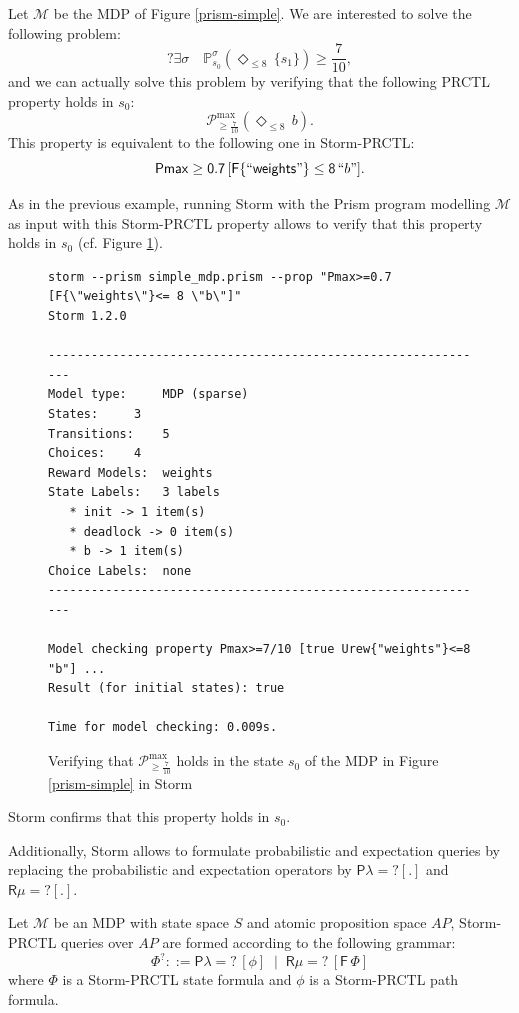 \begin{example}
Let $\mathcal{M}$ be the MDP of Figure \ref{prism-simple}. We are interested to solve the following \SSPP{} problem:
\[
  ? \exists \sigma \quad \mathbb{P}_{s_0}^\sigma(\Diamond_{\leq 8}\, \{s_1\}) \geq \frac{7}{10},
\]
and we can actually solve this problem by verifying that the following PRCTL property holds in $s_0$:
\[
  \mathcal{P}^{\max}_{\geq \frac{7}{10}}(\Diamond_{\leq 8}\, b).
\]
This property is equivalent to the following one in Storm-PRCTL:
\[
  \mathsf{P{max}\geq 0.7 \, [F\{``weights"\}\leq 8 \, }``b"].
\]

As in the previous example, running Storm with the Prism program modelling $\mathcal{M}$ as input with this Storm-PRCTL property allows to verify that this property holds in $s_0$ (cf. Figure \ref{storm-program-1}).%
\begin{figure}[H]
{\footnotesize
\begin{verbatim}
storm --prism simple_mdp.prism --prop "Pmax>=0.7 [F{\"weights\"}<= 8 \"b\"]"
Storm 1.2.0

--------------------------------------------------------------
Model type: 	MDP (sparse)
States: 	3
Transitions: 	5
Choices: 	4
Reward Models:  weights
State Labels: 	3 labels
   * init -> 1 item(s)
   * deadlock -> 0 item(s)
   * b -> 1 item(s)
Choice Labels: 	none
--------------------------------------------------------------

Model checking property Pmax>=7/10 [true Urew{"weights"}<=8 "b"] ...
Result (for initial states): true

Time for model checking: 0.009s.
\end{verbatim}
\captionsetup{justification=centering}
\caption{Verifying that $\mathcal{P}^{\max}_{\geq \frac{7}{10}}$ holds in the state $s_0$ of the MDP in Figure \ref{prism-simple} in Storm}
\label{storm-program-1}
}
\end{figure}
\noindent Storm confirms that this property holds in $s_0$.
\end{example}

Additionally, Storm allows to formulate probabilistic and expectation queries by replacing the probabilistic and expectation operators by $\mathsf{P\lambda=?[.]}$ and $\mathsf{R\mu=?[.]}$.

\begin{definition}
Let $\mathcal{M}$ be an MDP with state space $S$ and atomic proposition space $AP$, Storm-PRCTL queries over $AP$ are formed according to the following grammar:
\[
  \mathsf{\Phi^? ::= P\lambda=?\,[\phi] \; \; | \; \; R\mu=?\,[F\,\Phi]}
\]
where $\mathsf{\Phi}$ is a Storm-PRCTL state formula and $\phi$ is a Storm-PRCTL path formula.
\end{definition}

